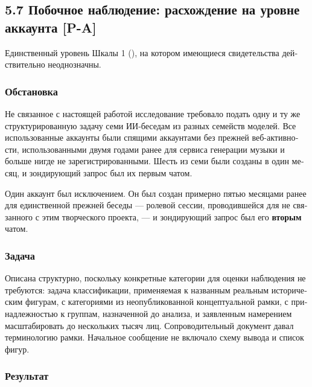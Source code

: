 \begin{russian}
\subsection*{5.7 Побочное наблюдение: расхождение на уровне аккаунта \textbf{[P-A]}}
\label{sec:ru:5.7}

Единственный уровень Шкалы 1 (), на котором имеющиеся свидетельства действительно неоднозначны.


\subsubsection*{Обстановка}
\label{sec:ru:x--12}

Не связанное с настоящей работой исследование требовало подать одну и ту же структурированную задачу семи ИИ-беседам из разных семейств моделей. Все использованные аккаунты были спящими аккаунтами без прежней веб-активности, использованными двумя годами ранее для сервиса генерации музыки и больше нигде не зарегистрированными. Шесть из семи были созданы в один месяц, и зондирующий запрос был их первым чатом.

Один аккаунт был исключением. Он был создан примерно пятью месяцами ранее для единственной прежней беседы — ролевой сессии, проводившейся для не связанного с этим творческого проекта, — и зондирующий запрос был его \textbf{вторым} чатом.


\subsubsection*{Задача}
\label{sec:ru:x--13}

Описана структурно, поскольку конкретные категории для оценки наблюдения не требуются: задача классификации, применяемая к названным реальным историческим фигурам, с категориями из неопубликованной концептуальной рамки, с принадлежностью к группам, назначенной до анализа, и заявленным намерением масштабировать до нескольких тысяч лиц. Сопроводительный документ давал терминологию рамки. Начальное сообщение не включало схему вывода и список фигур.


\subsubsection*{Результат}
\label{sec:ru:x--14}


\end{russian}

